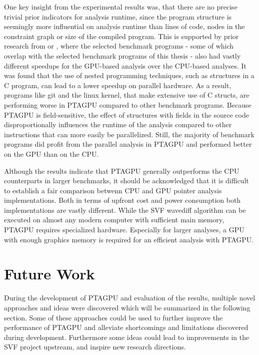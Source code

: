 One key insight from the experimental results was, that there are no precise trivial prior indicators for analysis runtime, since the program structure is seemingly more influential on analysis runtime than lines of code, nodes in the constraint graph or size of the compiled program.
This is supported by prior research from \cite{mendez2012gpu} or \cite{su2015efficient}, where the selected benchmark programs - some of which overlap with the selected benchmark programs of this thesis - also had vastly different speedups for the GPU-based analysis over the CPU-based analyses.
It was found that the use of nested programming techniques, such as structures in a C program, can lead to a lower speedup on parallel hardware.
As a result, programs like git and the linux kernel, that make extensive use of C structs, are performing worse in PTAGPU compared to other benchmark programs.
Because PTAGPU is field-sensitive, the effect of structures with fields in the source code disproportionally influences the runtime of the analysis compared to other instructions that can more easily be parallelized.
Still, the majority of benchmark programs did profit from the parallel analysis in PTAGPU and performed better on the GPU than on the CPU.

Although the results indicate that PTAGPU generally outperforms the CPU counterparts in larger benchmarks, it should be acknowledged that it is difficult to establish a fair comparison betwenn CPU and GPU pointer analysis implementations.
Both in terms of upfront cost and power consumption both implementations are vastly different. While the SVF wavediff algorithm can be executed on almost any modern computer with sufficient main memory, PTAGPU requires specialized hardware. Especially for larger analyses, a GPU with enough graphics memory is required for an efficient analysis with PTAGPU.

\section{Future Work}
During the development of PTAGPU and evaluation of the results, multiple novel approaches and ideas were discovered which will be summarized in the following section.
Some of these approaches could be used to further improve the performance of PTAGPU and alleviate shortcomings and limitations discovered during development.
Furthermore some ideas could lead to improvements in the SVF project upstream, and inspire new research directions.

